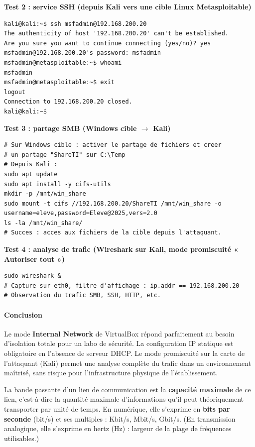 \documentclass[11pt]{article}
\newcommand{\cle}[1]{{\popxbold\color{popdark}#1}}
\newcounter{popsec}
\newcounter{popsub}
\newcommand{\courssub}[1]{%
  \stepcounter{popsub}%
  \par\vspace{9pt}\noindent{\popxbold\fontsize{11.5}{13}\selectfont\color{popink}{\color{poporange}\thepopsec.\thepopsub}\hspace{6pt}#1}\par\nopagebreak\vspace{4pt}
}
\begin{document}
\begin{exoresolu}
\textbf{Test 2 : service SSH (depuis Kali vers une cible Linux Metasploitable)}
\begin{lstlisting}
kali@kali:~$ ssh msfadmin@192.168.200.20
The authenticity of host '192.168.200.20' can't be established.
Are you sure you want to continue connecting (yes/no)? yes
msfadmin@192.168.200.20's password: msfadmin
msfadmin@metasploitable:~$ whoami
msfadmin
msfadmin@metasploitable:~$ exit
logout
Connection to 192.168.200.20 closed.
kali@kali:~$
\end{lstlisting}

\textbf{Test 3 : partage SMB (Windows cible $\rightarrow$ Kali)}
\begin{lstlisting}
# Sur Windows cible : activer le partage de fichiers et creer
# un partage "ShareTI" sur C:\Temp
# Depuis Kali :
sudo apt update
sudo apt install -y cifs-utils
mkdir -p /mnt/win_share
sudo mount -t cifs //192.168.200.20/ShareTI /mnt/win_share -o username=eleve,password=Eleve@2025,vers=2.0
ls -la /mnt/win_share/
# Succes : acces aux fichiers de la cible depuis l'attaquant.
\end{lstlisting}

\textbf{Test 4 : analyse de trafic (Wireshark sur Kali, mode promiscuité « Autoriser tout »)}
\begin{lstlisting}
sudo wireshark &
# Capture sur eth0, filtre d'affichage : ip.addr == 192.168.200.20
# Observation du trafic SMB, SSH, HTTP, etc.
\end{lstlisting}

\paragraph{Conclusion}
Le mode \textbf{Internal Network} de VirtualBox répond parfaitement au besoin d'isolation totale pour un labo de sécurité. La configuration IP statique est obligatoire en l'absence de serveur DHCP. Le mode promiscuité sur la carte de l'attaquant (Kali) permet une analyse complète du trafic dans un environnement maîtrisé, sans risque pour l'infrastructure physique de l'établissement.
\end{exoresolu}

\courssub{Notions de débit et de bande passante}
\begin{definition}
La \cle{bande passante} d'un lien de communication est la \textbf{capacité maximale} de ce lien, c'est-à-dire la quantité maximale d'informations qu'il peut théoriquement transporter par unité de temps. En numérique, elle s'exprime en \textbf{bits par seconde} (bit/s) et ses multiples : Kbit/s, Mbit/s, Gbit/s. (En transmission analogique, elle s'exprime en hertz (Hz) : largeur de la plage de fréquences utilisables.)
\end{definition}
\end{document}

